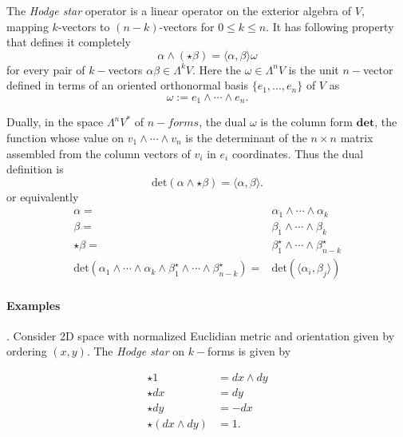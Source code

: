 {    The \textit{Hodge star} operator is a linear operator on the exterior algebra of $V$, mapping $k$-vectors to $(n-k)$-vectors for $0\leq k \leq n$. It has following property that defines it completely
    \begin{equation}
    \alpha\wedge(\star\beta) = \langle\alpha,\beta\rangle\omega 
    \end{equation}
    for every pair of $k-$vectors $\alpha\beta\in\Lambda^kV$.
    Here the $\omega\in\Lambda^nV$ is the unit $n-$vector defined in terms of an oriented orthonormal basis $\{e_1,...,e_n\}$ of $V$ as
    \begin{equation}
    \omega := e_1 \wedge \cdots \wedge e_n.
    \end{equation}
    
    Dually, in the space $\Lambda^n V^*$ of $n-forms$, the dual $\omega$ is the column form $\textbf{det}$, the function whose value on $v_1\wedge\cdots\wedge v_n$ is the determinant of the $n\times n$ matrix assembled from the column vectors of $v_i$ in $e_i$ coordinates. Thus the dual definition is 
    \begin{equation}
    \text{det}(\alpha\wedge\star\beta) = \langle\alpha,\beta\rangle.
    \end{equation}
    or equivalently 
    \begin{align}
    \alpha =& \alpha_1\wedge\cdots\wedge\alpha_k \\
    \beta =& \beta_1\wedge\cdots\wedge\beta_k \\
    \star\beta =& \beta_1 ^{\star} \wedge\cdots\wedge \beta_{n-k} ^ {\star} \\
    \text{det}(\alpha_1\wedge\cdots\wedge\alpha_k\wedge\beta_1 ^{\star}\wedge\cdots\wedge\beta_{n-k}^{\star}) =& \text{det}(\langle\alpha_i,\beta_j\rangle)
    \end{align}
    
    \paragraph{Examples}.
    Consider 2D space with normalized Euclidian metric and orientation given by ordering $(x,y)$. The \textit{Hodge star} on $k-$forms is given by 
    
    \begin{align}
    \star 1 &= dx \wedge dy \\
    \star dx &= dy \\
    \star dy &= -dx \\
    \star(dx \wedge dy) &= 1.
    \end{align}
    
}
